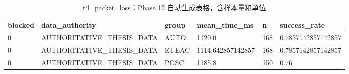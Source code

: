 \begin{table}[htbp]
\centering
\caption{t4_packet_loss：Phase 12 自动生成表格，含样本量和单位}
\begin{tabular}{llllll}
\hline
blocked & data_authority & group & mean_time_ms & n & success_rate \\
\hline
0 & AUTHORITATIVE\_THESIS\_DATA & AUTO & 1120.0 & 168 & 0.7857142857142857 \\
0 & AUTHORITATIVE\_THESIS\_DATA & ETEAC & 1114.642857142857 & 168 & 0.7857142857142857 \\
0 & AUTHORITATIVE\_THESIS\_DATA & PCSC & 1185.8 & 150 & 0.76 \\
\hline
\end{tabular}
\end{table}
